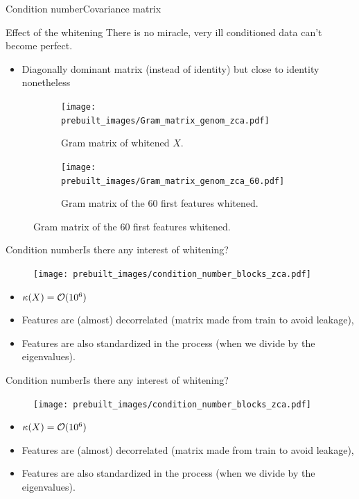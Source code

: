 \documentclass[10pt,aspectratio=43]{beamer}
\begin{document}
\begin{frame}{Condition number}{Covariance matrix}
    \begin{block}{Effect of the whitening}
        There is no miracle, very ill conditioned data can't become perfect.
        \begin{itemize}
            \item Diagonally dominant matrix (instead of identity) but close to identity nonetheless
        \end{itemize}
    \end{block}
    \begin{figure}[ht!]
        \begin{subfigure}{.4\paperwidth}
            \centering
            \texttt{[image: prebuilt\_images/Gram\_matrix\_genom\_zca.pdf]}
            \caption{Gram matrix of whitened $X$.}
        \end{subfigure}
        \begin{subfigure}{.4\paperwidth}
            \centering
            \texttt{[image: prebuilt\_images/Gram\_matrix\_genom\_zca\_60.pdf]}
            \caption{Gram matrix of the $60$ first features whitened.}
        \end{subfigure}
    \end{figure}
    \end{frame}

\begin{frame}{Condition number}{Is there any interest of whitening?}
\begin{figure}
    \texttt{[image: prebuilt\_images/condition\_number\_blocks\_zca.pdf]}
\end{figure}
\begin{block}{}
    \begin{itemize}
        \item $\kappa(X)=\mathcal{O}(10^6)$
        \item Features are (almost) decorrelated (matrix made from train to avoid leakage),
        \item Features are also standardized in the process (when we divide by the eigenvalues).
    \end{itemize}
\end{block}
\end{frame}

\begin{frame}{Condition number}{Is there any interest of whitening?}
\begin{figure}
    \texttt{[image: prebuilt\_images/condition\_number\_blocks\_zca.pdf]}
\end{figure}
\begin{block}{}
    \begin{itemize}
        \item $\kappa(X)=\mathcal{O}(10^6)$
        \item Features are (almost) decorrelated (matrix made from train to avoid leakage),
        \item Features are also standardized in the process (when we divide by the eigenvalues).
    \end{itemize}
\end{block}
\end{frame}
\end{document}
